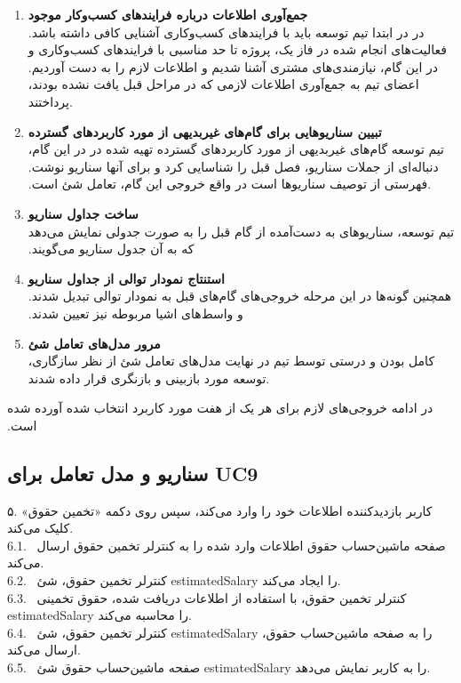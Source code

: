 \documentclass[12pt]{article}
\begin{document}
	\begin{enumerate}
		\item
		\textbf{جمع‌‬آوری‬‫ اطلاعات‬ ‫درباره‬ ‬‫فرایندهای‬ ‫کسب‬‌‫و‌کار‬ ‫موجود‬}\\
		در ‬‫ابتدا‬ ‫تیم‬ ‫توسعه‬ ‫باید‬ ‫با‬ ‫فرایندهای‬ ‫کسب‌وکاری‬ ‫آشنایی‬ ‫کافی‬ ‫داشته‬ ‫باشد‪.‬‬ ‫در‬ ‫فعالیت‫‌های ‬‫انجام‬ ‫شده‬ ‫در‬ ‫فاز ‬‫یک‪،‬‬ ‫پروژه‬ ‫تا‬ ‫حد‬ ‫مناسبی‬ ‫با‬ ‫فرایندهای‬ ‫کسب‬‌و‌‌کاری‬ ‫و‬ ‫نیازمندی‬‌های‬ ‫مشتری‬ ‫آشنا‬ ‫شدیم‬ ‫و‬ ‫اطلاعات‬ ‫لازم ‬‫را‬ ‫به‬ ‫دست‬ ‫آوردیم‪.‬‬ ‫در‬ ‫این‬ ‫گام‬، ‬‬‫اعضای‬ ‫تیم‬ ‫به‬ ‫جمع‬‌آوری ‬‫اطلاعات‬ لازمی ‫که‬ ‫در‬ ‫مراحل‬ ‫قبل‬ ‫یافت‬ ‫نشده‬‌‫ بودند، پرداختند‬.
		\item
		\textbf{‫تبیین‬ ‫سناریوهایی‬ ‫برای‬ ‫گام‬‌‫های‬‫ غیر‌بدیهی‬ ‫از‬ ‫مورد‬ ‫کاربردهای‬ ‫گسترده‬‬}\\
		در ‬‫این‬ ‫گام‪،‬‬ ‫تیم‬ ‫توسعه‬ ‫گام‬‌‫های ‬‫غیر‌بدیهی‬ ‫از‬ ‫مورد‬ ‫کاربردهای‬ ‫گسترده‬ ‫تهیه‬ ‫شده‬ ‫در‬ ‫فصل‬ ‫قبل‬ ‫را‬ ‫شناسایی‬ ‫کرد ‬‫و‬ ‫برای‬ ‫آن‬ها ‬‫سناریو‬ ‫نوشت‪.‬‬ ‫سناریو‪،‬‬ ‫دنباله‌‬‫ای ‬‫از‬ ‫جملات‬ ‫تعامل‬ ‫شئ‬ ‫است‪.‬‬ ‫در‬ ‫واقع‬ ‫خروجی‬ ‫این‬ ‫گام‪،‬‬ ‫فهرستی ‬‫از‬ ‫توصیف‬ ‫سناریوها‬ ‫است‬.
		\item
		\textbf{ساخت جداول سناریو‬‬}\\
		‫تیم ‬‫توسعه،‬ ‫سناریوهای‬ ‫به‬ ‫دست‬‫‌آمده‬ ‫از‬ ‫گام‬ ‫قبل‬ ‫را‬ ‫به‬ ‫صورت‬ ‫جدولی‬ ‫نمایش‬ ‫می‌‬دهد ‬‫که‬ ‫به‬ ‫آن‬ ‫جدول‬ ‫سناریو‬ ‫می‌‌‬‫گویند‪.‬‬

		\item
		\textbf{استنتاج نمودار توالی از جداول سناریو‬‬}\\
		‫در ‬‫این‬ ‫مرحله خروجی‬‌های ‬‫گام‬‌‫های ‬‫قبل‬ ‫به‬ ‫نمودار‬ ‫توالی‬ ‫تبدیل‬ ‫شدند‪.‬‬ ‫همچنین‬ ‫گونه‬‌ها ‬‫و‬ ‫واسط‌‬های‬ ‫اشیا‬ ‫مربوطه ‬‫نیز‬ ‫تعیین‬ ‫شدند‪.‬‬


		\item
		\textbf{مرور مدل‌های تعامل شئ‬‬}\\
		در نهایت ‬‫مدل‌‬های ‬‫تعامل‬ ‫شئ‬ ‫از‬ ‫نظر‬ ‫سازگاری‪،‬‬ ‫کامل‬ ‫بودن‬ ‫و‬ ‫درستی‬ ‫توسط‬ ‫تیم‬ ‫توسعه‬ ‫مورد‬ ‫بازبینی‬ ‫و‬ ‫بازنگری‬‫ قرار‬ ‫داده‬ ‫شدند‬.

	\end{enumerate}
	‫در ‬‫ادامه‬ ‫خروجی‌‬‫های لازم ‫برای‬ ‫هر‬ ‫یک‬ ‫از‬ هفت ‫مورد‬ ‫کاربرد‬ ‫انتخاب‬ ‫شده‬ ‫آورده‬ ‫شده‬ ‫است‬.
	\newpage
	\subsection{سناریو و مدل تعامل برای UC9}

	۵. کاربر بازدیدکننده اطلاعات خود را وارد می‌کند، سپس روی دکمه «تخمین حقوق» کلیک می‌کند.\\
	6.1. \ صفحه ماشین‌حساب حقوق اطلاعات وارد شده را به کنترلر تخمین حقوق ارسال می‌کند.\\
	6.2. \ کنترلر تخمین حقوق، شئ estimatedSalary را ایجاد می‌کند.\\
	6.3. \ کنترلر تخمین حقوق، با استفاده از اطلاعات دریافت شده، حقوق تخمینی estimatedSalary را محاسبه می‌کند.\\
	6.4. \ کنترلر تخمین حقوق، شئ estimatedSalary را به صفحه ماشین‌حساب حقوق، ارسال می‌کند.\\
	6.5. \ صفحه ماشین‌حساب حقوق شئ ‌estimatedSalary را به کاربر نمایش می‌دهد.\\
\end{document}
